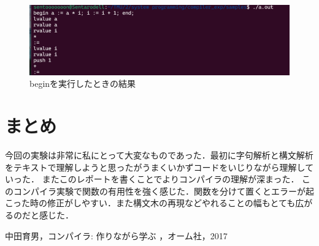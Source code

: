 \documentclass[fleqn, a4paper. 12pt]{ltjsarticle} %
\begin{document}
  \begin{figure}[H]
	\centering
	\includegraphics[width=0.8\linewidth]{"images/BEGIN.png"}
	\caption{beginを実行したときの結果}
	\label{fig:BEGIN}
  \end{figure}

  \section{まとめ}

  今回の実験は非常に私にとって大変なものであった．最初に字句解析と構文解析をテキストで理解しようと思ったがうまくいかずコードをいじりながら理解していった．
  またこのレポートを書くことでよりコンパイラの理解が深まった．
  このコンパイラ実験で関数の有用性を強く感じた．関数を分けて置くとエラーが起こった時の修正がしやすい．また構文木の再現などやれることの幅もとても広がるのだと感じた．

  \begin{appendices}
	

	\end{appendices}



  
    \begin{thebibliography}{00}
        中田育男，コンパイラ: 作りながら学ぶ ，オーム社，2017
        \end{thebibliography}
\end{document}
